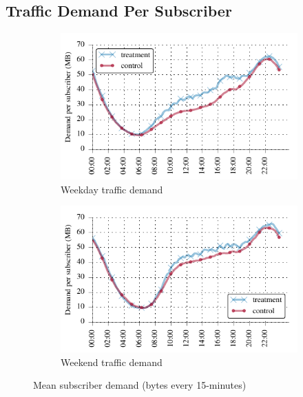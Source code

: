 \subsection{Traffic Demand Per Subscriber}\label{subsec:behavior}

\begin{figure}[t]
\begin{minipage}{1\linewidth}
\centering
%
\begin{subfigure}[b]{.99\linewidth}
\includegraphics[width=\linewidth]{figures/weekday_demand_mean.pdf}
               \caption{Weekday traffic demand\label{fig:weekday-daily-usage}}
\end{subfigure}
%
\begin{subfigure}[b]{.99\linewidth}
\includegraphics[width=\linewidth]{figures/weekend_demand_mean.pdf}
               \caption{Weekend traffic demand\label{fig:weekend-daily-usage}}
\end{subfigure}
%
\end{minipage}
\caption{Mean subscriber demand (bytes every 15-minutes)}
\label{fig:traffic-demand-timeseries}
\end{figure}

